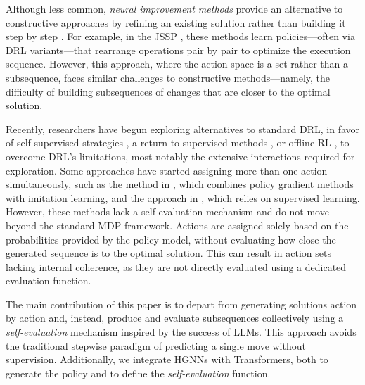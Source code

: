Although less common, \emph{neural improvement methods} provide an alternative to constructive approaches by refining an existing solution rather than building it step by step \cite{garmendia2023neural}. For example, in the JSSP \cite{zhang2024deep}, these methods learn policies—often via DRL variants—that rearrange operations pair by pair to optimize the execution sequence. However, this approach, where the action space is a set rather than a subsequence, faces similar challenges to constructive methods—namely, the difficulty of building subsequences of changes that are closer to the optimal solution.

Recently, researchers have begun exploring alternatives to standard DRL, in favor of self-supervised strategies \cite{corsini2024self, pirnay2024self}, a return to supervised methods \cite{drakulic2024bq}, or offline RL \cite{echeverria2024offline}, to overcome DRL’s limitations, most notably the extensive interactions required for exploration. Some approaches have started assigning more than one action simultaneously, such as the method in \citep{tassel2023end}, which combines policy gradient methods with imitation learning, and the approach in \citep{echeverria2024multi}, which relies on supervised learning. However, these methods lack a self-evaluation mechanism and do not move beyond the standard MDP framework. Actions are assigned solely based on the probabilities provided by the policy model, without evaluating how close the generated sequence is to the optimal solution. This can result in action sets lacking internal coherence, as they are not directly evaluated using a dedicated evaluation function.

The main contribution of this paper is to depart from generating solutions action by action and, instead, produce and evaluate subsequences collectively using a \emph{self-evaluation} mechanism inspired by the success of LLMs. This approach avoids the traditional stepwise paradigm of predicting a single move without supervision. Additionally, we integrate HGNNs with Transformers, both to generate the policy and to define the \emph{self-evaluation} function.